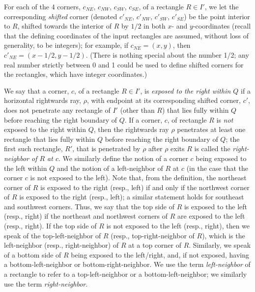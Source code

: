 \documentclass{article}
\begin{document}
For each of the 4 corners, $c_{NE}$, $c_{NW}$, $c_{SW}$, $c_{SE}$, of
a rectangle $R\in I'$, we let the corresponding {\em shifted} corner
(denoted $c'_{NE}$, $c'_{NW}$, $c'_{SW}$, $c'_{SE}$) be the point
interior to $R$, shifted towards the interior of $R$ by $1/2$ in both
$x$- and $y$-coordinates (recall that the defining coordinates of the
input rectangles are assumed, without loss of generality, to be
integers); for example, if $c_{NE}=(x,y)$, then $c'_{NE}=(x-1/2, y-1/2)$.
(There is nothing special about the number 1/2; any real
number strictly between 0 and 1 could be used to define shifted
corners for the rectangles, which have integer coordinates.)

We say that a corner, $c$, of a rectangle $R\in I'$, is
{\em exposed to the right within $Q$} if a horizontal rightwards ray,
$\rho$, with endpoint at its corresponding shifted corner, $c'$, does
not penetrate any rectangle of $I'$ (other than $R$) that lies fully
within $Q$ before reaching the right boundary of $Q$.
%
%
If a corner, $c$, of rectangle $R$ is
{\em not} exposed to the right within $Q$, then the rightwards ray
$\rho$ penetrates at least one rectangle that lies fully within $Q$
before reaching the right boundary of $Q$; the first such rectangle,
$R'$, that is penetrated by $\rho$ after $\rho$ exits $R$ is called
the {\em right-neighbor of $R$ at $c$}.
%
%
We similarly define the notion of a
corner $c$ being exposed to the left within $Q$ and the notion
of a left-neighbor of $R$ at $c$ (in the case that the corner $c$ is not exposed to the left). Note that, from the definition, the
northeast corner of $R$ is exposed to the right (resp., left) if and
only if the northwest corner of $R$ is exposed to the right (resp.,
left); a similar statement holds for southeast and southwest corners.
%
%
Thus, we say that the top side of $R$ is exposed to the
left (resp., right) if the northeast and northwest corners of $R$ are exposed
to the left (resp., right).
If the top side of $R$ is not exposed to the left (resp., right), then we speak of the top-left-neighbor of $R$ (resp., top-right-neighbor of $R$), which is the left-neighbor (resp., right-neighbor) of $R$ at a top corner of $R$.
Similarly, we speak of a bottom side of $R$ being exposed to the left/right, and, if not exposed, having a bottom-left-neighbor or bottom-right-neighbor. We use the term {\em left-neighbor} of a rectangle to refer to a top-left-neighbor or a bottom-left-neighbor; we similarly use the term {\em right-neighbor}.
%
\end{document}
